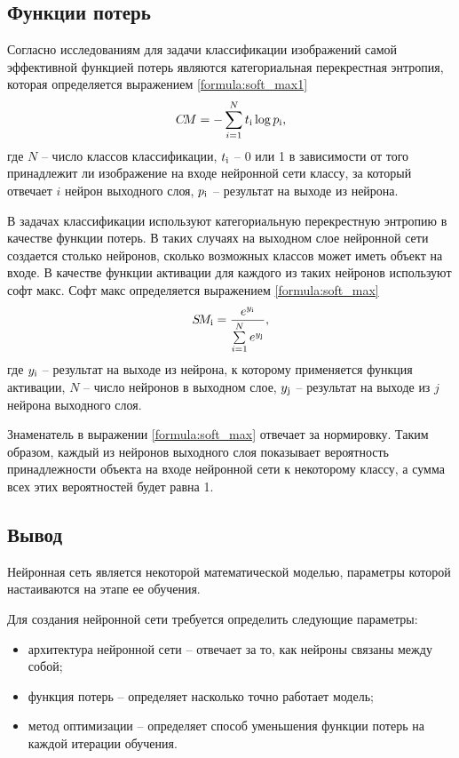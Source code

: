\subsection{Функции потерь}
Согласно исследованиям \cite{loss_function} для задачи классификации изображений самой эффективной функцией потерь являются категориальная перекрестная энтропия, которая определяется выражением \ref{formula:soft_max1}
\begin{equation}\label{formula:soft_max1}
C\!M = - \sum\limits_{i = 1}^{N}t_{\rm{i}}\log{p_{\rm{i}}},
\end{equation}
где $N$ -- число классов классификации, $t_{\rm{i}}$ -- 0 или 1 в зависимости от того принадлежит ли изображение на входе нейронной сети классу, за который отвечает $i$ нейрон выходного слоя, $p_{\rm{i}}$ -- результат на выходе из нейрона.

В задачах классификации используют категориальную перекрестную энтропию в качестве функции потерь. В таких случаях на выходном слое нейронной сети создается столько нейронов, сколько возможных классов может иметь объект на входе. В качестве функции активации для каждого из таких нейронов используют софт макс. Софт макс определяется выражением \ref{formula:soft_max}
\begin{equation}\label{formula:soft_max}
S\!M_{\rm{i}} = \frac{e^{y_{\rm{i}}}}{\sum\limits_{i = 1}^{N}e^{y_{\rm{j}}}},
\end{equation}
где $y_{\rm{i}}$ -- результат на выходе из нейрона, к которому применяется функция активации, $N$ -- число нейронов в выходном слое, $y_{\rm{j}}$ -- результат на выходе из $j$ нейрона выходного слоя.

Знаменатель в выражении \ref{formula:soft_max} отвечает за нормировку. Таким образом, каждый из нейронов выходного слоя показывает вероятность принадлежности объекта на входе нейронной сети к некоторому классу, а сумма всех этих вероятностей будет равна 1.

\subsection{Вывод}
Нейронная сеть является некоторой математической моделью, параметры которой настаиваются на этапе ее обучения.

Для создания нейронной сети требуется определить следующие параметры:
\begin{itemize}
	\item архитектура нейронной сети -- отвечает за то, как нейроны связаны между собой;
	\item функция потерь -- определяет насколько точно работает модель;
	\item метод оптимизации -- определяет способ уменьшения функции потерь на каждой итерации обучения.
\end{itemize}

